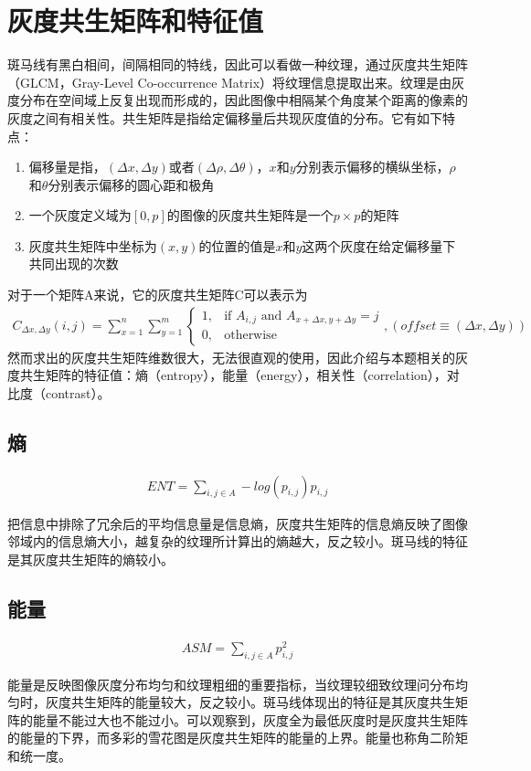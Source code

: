 \section{灰度共生矩阵和特征值}
\label{sec:cogrey}
斑马线有黑白相间，间隔相同的特线，因此可以看做一种纹理，通过灰度共生矩阵（GLCM，Gray-Level Co-occurrence Matrix）将纹理信息提取出来。纹理是由灰度分布在空间域上反复出现而形成的，因此图像中相隔某个角度某个距离的像素的灰度之间有相关性。共生矩阵是指给定偏移量后共现灰度值的分布。它有如下特点：
\begin{enumerate}
	\item 偏移量是指，$(\Delta x, \Delta y)$或者$(\Delta \rho, \Delta \theta)$，$x$和$y$分别表示偏移的横纵坐标，$\rho$和$\theta$分别表示偏移的圆心距和极角
	\item 一个灰度定义域为$[0,p]$的图像的灰度共生矩阵是一个$p \times p$的矩阵
	\item 灰度共生矩阵中坐标为$(x, y)$的位置的值是$x$和$y$这两个灰度在给定偏移量下共同出现的次数
\end{enumerate}\par
对于一个矩阵A来说，它的灰度共生矩阵C可以表示为
\begin{align}
C_{\Delta x, \Delta y}(i,j)=\sum_{x=1}^n\sum_{y=1}^m\begin{cases} 1, & \text{if }A_{i,j}\text{ and }A_{x+\Delta x, y+\Delta y}=j \\ 0, & \text{otherwise}\end{cases}, (offset \equiv (\Delta x, \Delta y))
\end{align}
然而求出的灰度共生矩阵维数很大，无法很直观的使用，因此介绍与本题相关的灰度共生矩阵的特征值：熵（entropy），能量（energy），相关性（correlation），对比度（contrast）。
\subsection{熵}
\begin{align}
ENT=\sum_{i,j\in A} -log(p_{i,j})p_{i,j}
\end{align}\par
把信息中排除了冗余后的平均信息量是信息熵，灰度共生矩阵的信息熵反映了图像邻域内的信息熵大小，越复杂的纹理所计算出的熵越大，反之较小。斑马线的特征是其灰度共生矩阵的熵较小。
\subsection{能量}
\begin{align}
ASM=\sum_{i,j\in A} p_{i,j}^2
\end{align}\par
能量是反映图像灰度分布均匀和纹理粗细的重要指标，当纹理较细致纹理问分布均匀时，灰度共生矩阵的能量较大，反之较小。斑马线体现出的特征是其灰度共生矩阵的能量不能过大也不能过小。可以观察到，灰度全为最低灰度时是灰度共生矩阵的能量的下界，而多彩的雪花图是灰度共生矩阵的能量的上界。能量也称角二阶矩和统一度。

